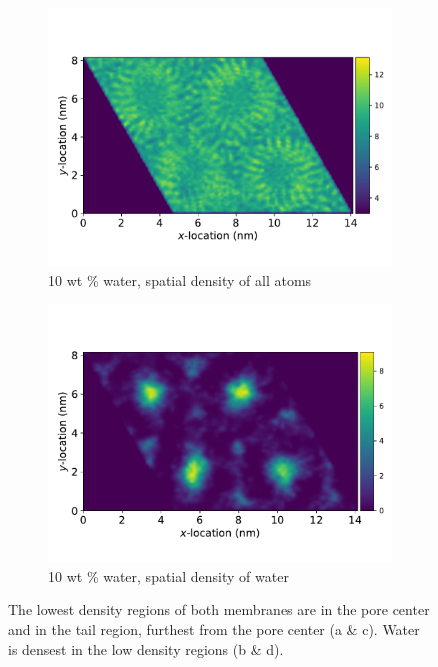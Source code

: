 \documentclass{article}
\begin{document}
\begin{figure}[!htb]
\begin{subfigure}{0.45\textwidth}
  \includegraphics[width=\textwidth]{total_density_10wt.pdf}
  \caption{10 wt \% water, spatial density of all atoms}\label{fig:total_density_10wt}
  \end{subfigure}
  \begin{subfigure}{0.45\textwidth}
  \includegraphics[width=\textwidth]{total_water_density_10wt.pdf}
  \caption{10 wt \% water, spatial density of water}\label{fig:total_water_density_10wt}
  \end{subfigure}
  \caption{The lowest density regions of both membranes are in the pore center and in the
  tail region, furthest from the pore center (a \& c). Water is densest in the low density
  regions (b \& d).}\label{fig:total_density}
  \end{figure}
\end{document}
